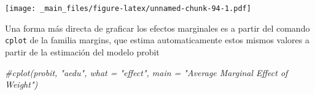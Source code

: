 \documentclass[
]{book}
\newenvironment{Shaded}{\begin{snugshade}}{\end{snugshade}}
\newcommand{\CommentTok}[1]{\textcolor[rgb]{0.56,0.35,0.01}{\textit{#1}}}
\begin{document}
\texttt{[image: \_main\_files/figure-latex/unnamed-chunk-94-1.pdf]}

Una forma más directa de graficar los efectos marginales es a partir del comando \texttt{cplot} de la familia margins, que estima automaticamente estos mismos valores a partir de la estimación del modelo probit

\begin{Shaded}
\begin{Highlighting}[]
\CommentTok{\#cplot(probit, "aedu", what = "effect", main = "Average Marginal Effect of Weight")}
\end{Highlighting}
\end{Shaded}


  
\end{document}
